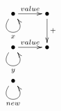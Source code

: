 $\xymatrix{
   \bullet \ar@(dl,dr)[]_{x} \ar[r]^{value} & \bullet \ar[d]^{+} \\
   \bullet \ar@(dl,dr)[]_{y} \ar[r]^{value} & \bullet \\
   \bullet \ar@(dl,dr)[]_{new}
}$
